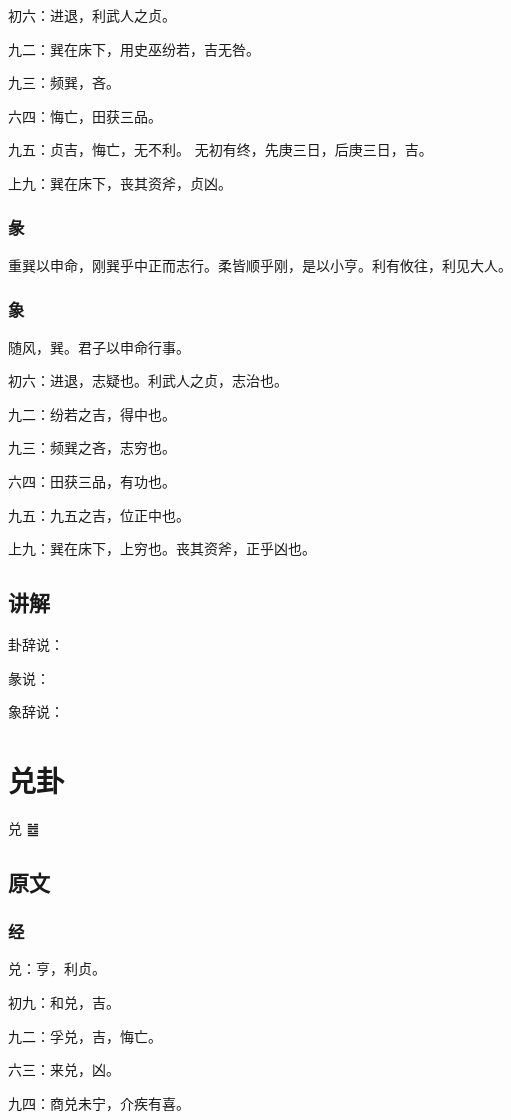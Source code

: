 \documentclass[12pt,oneside]{book}
\begin{document}
初六：进退，利武人之贞。

九二：巽在床下，用史巫纷若，吉无咎。

九三：频巽，吝。

六四：悔亡，田获三品。

九五：贞吉，悔亡，无不利。 无初有终，先庚三日，后庚三日，吉。

上九：巽在床下，丧其资斧，贞凶。

\subsection{彖}
重巽以申命，刚巽乎中正而志行。柔皆顺乎刚，是以小亨。利有攸往，利见大人。

\subsection{象}
随风，巽。君子以申命行事。

初六：进退，志疑也。利武人之贞，志治也。

九二：纷若之吉，得中也。

九三：频巽之吝，志穷也。

六四：田获三品，有功也。

九五：九五之吉，位正中也。

上九：巽在床下，上穷也。丧其资斧，正乎凶也。

\section{讲解}
卦辞说：

彖说：

象辞说：


\chapter{兑卦}
兑 {\Large ䷹}

\section{原文}

\subsection{经}
兑：亨，利贞。

初九：和兑，吉。

九二：孚兑，吉，悔亡。

六三：来兑，凶。

九四：商兑未宁，介疾有喜。
\end{document}
